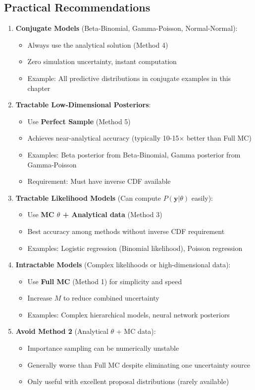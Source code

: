 \subsection{Practical Recommendations}
\begin{enumerate}
\item \textbf{Conjugate Models} (Beta-Binomial, Gamma-Poisson, Normal-Normal):
\begin{itemize}
\item Always use the analytical solution (Method 4)
\item Zero simulation uncertainty, instant computation
\item Example: All predictive distributions in conjugate examples in this chapter
\end{itemize}
\item \textbf{Tractable Low-Dimensional Posteriors}:
\begin{itemize}
\item Use \textbf{Perfect Sample} (Method 5)
\item Achieves near-analytical accuracy (typically 10-15× better than Full MC)
\item Examples: Beta posterior from Beta-Binomial, Gamma posterior from Gamma-Poisson
\item Requirement: Must have inverse CDF available
\end{itemize}
\item \textbf{Tractable Likelihood Models} (Can compute $P(\mathbf{y}|\theta)$ easily):
\begin{itemize}
\item Use \textbf{MC $\theta$ + Analytical data} (Method 3)
\item Best accuracy among methods without inverse CDF requirement
\item Examples: Logistic regression (Binomial likelihood), Poisson regression
\end{itemize}
\item \textbf{Intractable Models} (Complex likelihoods or high-dimensional data):
\begin{itemize}
\item Use \textbf{Full MC} (Method 1) for simplicity and speed
\item Increase $M$ to reduce combined uncertainty
\item Examples: Complex hierarchical models, neural network posteriors
\end{itemize}
\item \textbf{Avoid Method 2} (Analytical $\theta$ + MC data):
\begin{itemize}
\item Importance sampling can be numerically unstable
\item Generally worse than Full MC despite eliminating one uncertainty source
\item Only useful with excellent proposal distributions (rarely available)
\end{itemize}
\end{enumerate}

